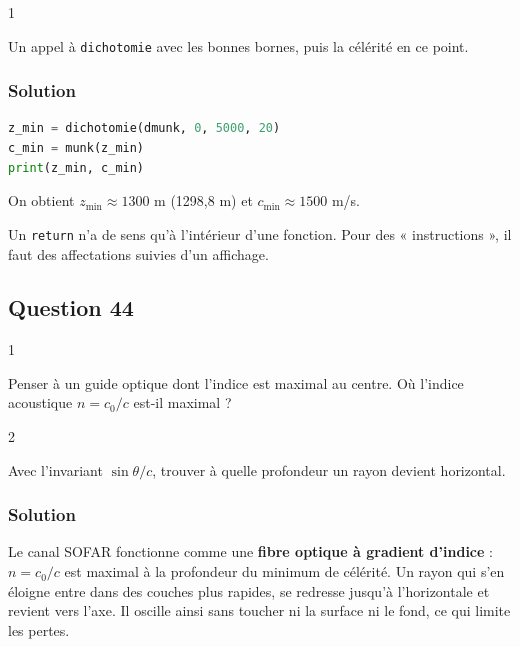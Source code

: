 \documentclass[11pt,a4paper]{article}
\begin{document}
\begin{indication}{1}

Un appel à \texttt{dichotomie} avec les bonnes bornes, puis la célérité en ce point.

\end{indication}

\hypertarget{solution-42}{%
\subsubsection{Solution}\label{solution-42}}

\begin{lstlisting}[language=Python]
z_min = dichotomie(dmunk, 0, 5000, 20)
c_min = munk(z_min)
print(z_min, c_min)
\end{lstlisting}

On obtient \(z_{\min} \approx 1300\) m (1298,8 m) et \(c_{\min} \approx 1500\) m/s.

\begin{piege}

Un \texttt{return} n'a de sens qu'à l'intérieur d'une fonction. Pour des « instructions », il faut des affectations suivies d'un affichage.

\end{piege}

\hypertarget{question-44}{%
\subsection{Question 44}\label{question-44}}

\begin{indication}{1}

Penser à un guide optique dont l'indice est maximal au centre. Où l'indice acoustique \(n = c_0/c\) est-il maximal ?

\end{indication}

\begin{indication}{2}

Avec l'invariant \(\sin\theta/c\), trouver à quelle profondeur un rayon devient horizontal.

\end{indication}

\hypertarget{solution-43}{%
\subsubsection{Solution}\label{solution-43}}

Le canal SOFAR fonctionne comme une \textbf{fibre optique à gradient d'indice} : \(n = c_0/c\) est maximal à la profondeur du minimum de célérité. Un rayon qui s'en éloigne entre dans des couches plus rapides, se redresse jusqu'à l'horizontale et revient vers l'axe. Il oscille ainsi sans toucher ni la surface ni le fond, ce qui limite les pertes.
\end{document}
